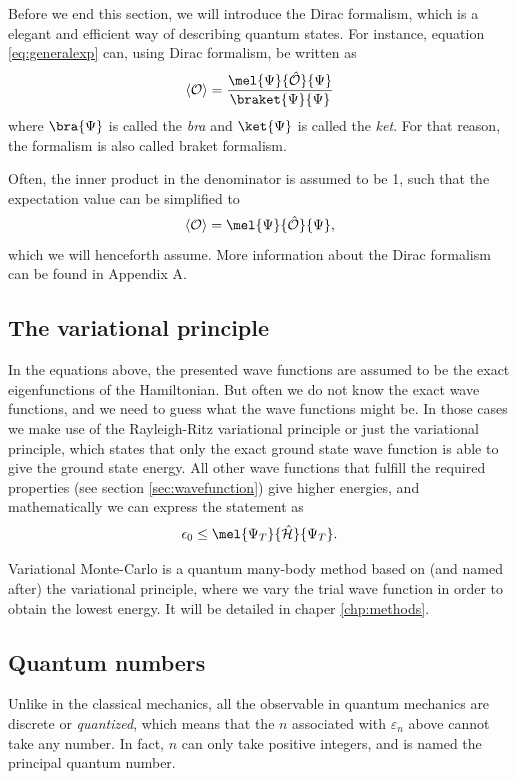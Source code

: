 Before we end this section, we will introduce the Dirac formalism, which is a elegant and efficient way of describing quantum states. For instance, equation \eqref{eq:generalexp} can, using Dirac formalism, be written as
\begin{equation}
\langle \mathcal{O}\rangle=\frac{\mel{\Psi}{\mathcal{\hat{O}}}{\Psi}}{\braket{\Psi}{\Psi}}
\end{equation}
where $\bra{\Psi}$ is called the \textit{bra} and $\ket{\Psi}$ is called the \textit{ket}. For that reason, the formalism is also called braket formalism. 

Often, the inner product in the denominator is assumed to be 1, such that the expectation value can be simplified to
\begin{equation}
\langle \mathcal{O}\rangle=\mel{\Psi}{\mathcal{\hat{O}}}{\Psi},
\end{equation}
which we will henceforth assume. More information about the Dirac formalism can be found in Appendix A. 

\subsection{The variational principle}
In the equations above, the presented wave functions are assumed to be the exact eigenfunctions of the Hamiltonian. But often we do not know the exact wave functions, and we need to guess what the wave functions might be. In those cases we make use of the Rayleigh-Ritz variational principle or just the variational principle, which states that only the exact ground state wave function is able to give the ground state energy. All other wave functions that fulfill the required properties (see section \ref{sec:wavefunction}) give higher energies, and mathematically we can express the statement as
\begin{equation}
\epsilon_0\leq\mel{\Psi_T}{\hat{\mathcal{H}}}{\Psi_T}.
\label{eq:variationalprinciple}
\end{equation}

Variational Monte-Carlo is a quantum many-body method based on (and named after) the variational principle, where we vary the trial wave function in order to obtain the lowest energy. It will be detailed in chaper \eqref{chp:methods}.

\subsection{Quantum numbers}
Unlike in the classical mechanics, all the observable in quantum mechanics are discrete or \textit{quantized}, which means that the $n$ associated with $\varepsilon_n$ above cannot take any number. In fact, $n$ can only take positive integers, and is named the principal quantum number.

